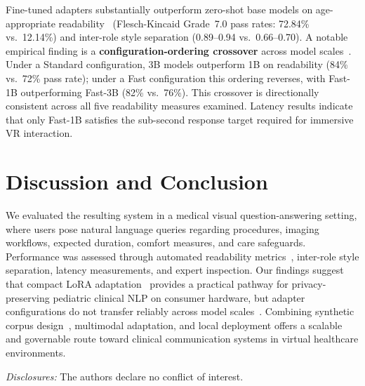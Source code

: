 \documentclass[conference]{IEEEtran}
\begin{document}
Fine-tuned adapters substantially outperform zero-shot base models on age-appropriate readability~\cite{flesch1948,gunning1952,senter1967,mclaughlin1969,kincaid1974,kincaid1975,coleman1975} (Flesch-Kincaid Grade~7.0 pass rates: 72.84\% vs.\ 12.14\%) and inter-role style separation (0.89--0.94 vs.\ 0.66--0.70). A notable empirical finding is a \textbf{configuration-ordering crossover} across model scales~\cite{biderman2024}. Under a Standard configuration, 3B models outperform 1B on readability (84\% vs.\ 72\% pass rate); under a Fast configuration this ordering reverses, with Fast-1B outperforming Fast-3B (82\% vs.\ 76\%). This crossover is directionally consistent across all five readability measures examined. Latency results indicate that only Fast-1B satisfies the sub-second response target required for immersive VR interaction.

\section{Discussion and Conclusion}

We evaluated the resulting system in a medical visual question-answering setting, where users pose natural language queries regarding procedures, imaging workflows, expected duration, comfort measures, and care safeguards. Performance was assessed through automated readability metrics~\cite{flesch1948,gunning1952,senter1967,mclaughlin1969,kincaid1974,kincaid1975,coleman1975}, inter-role style separation, latency measurements, and expert inspection. Our findings suggest that compact LoRA adaptation~\cite{hu2022lora} provides a practical pathway for privacy-preserving pediatric clinical NLP on consumer hardware, but adapter configurations do not transfer reliably across model scales~\cite{biderman2024}. Combining synthetic corpus design~\cite{zhou2023lima}, multimodal adaptation, and local deployment offers a scalable and governable route toward clinical communication systems in virtual healthcare environments.

\vspace{4pt}
\noindent\textit{Disclosures:} The authors declare no conflict of interest.
\end{document}
